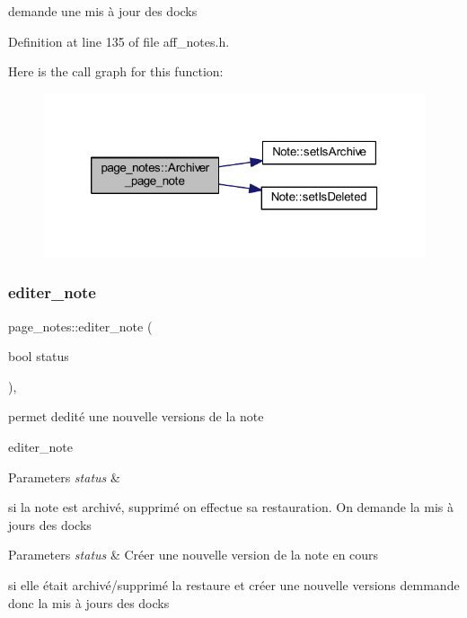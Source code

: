 demande une mis à jour des docks 

Definition at line 135 of file aff\+\_\+notes.\+h.

Here is the call graph for this function\+:\nopagebreak
\begin{figure}[H]
\begin{center}
\leavevmode
\includegraphics[width=320pt]{classpage__notes_a8d23f8f379d4aa402193f589ac3e4afa_cgraph}
\end{center}
\end{figure}
\mbox{\label{classpage__notes_a9fd367fb577c6048353f18ad56792c1f}} 
\subsubsection{\texorpdfstring{editer\+\_\+note}{editer\_note}}
{\footnotesize\ttfamily page\+\_\+notes\+::editer\+\_\+note (\begin{DoxyParamCaption}\item[{bool}]{status }\end{DoxyParamCaption})\hspace{0.3cm}{\ttfamily [inline]}, {\ttfamily [slot]}}



permet d\textquotesingle{}edité une nouvelle versions de la note 

editer\+\_\+note 
\begin{DoxyParams}{Parameters}
{\em status} & \\
\hline
\end{DoxyParams}
si la note est archivé, supprimé on effectue sa restauration. On demande la mis à jours des docks


\begin{DoxyParams}{Parameters}
{\em status} & Créer une nouvelle version de la note en cours\\
\hline
\end{DoxyParams}
si elle était archivé/supprimé la restaure et créer une nouvelle versions demmande donc la mis à jours des docks 

